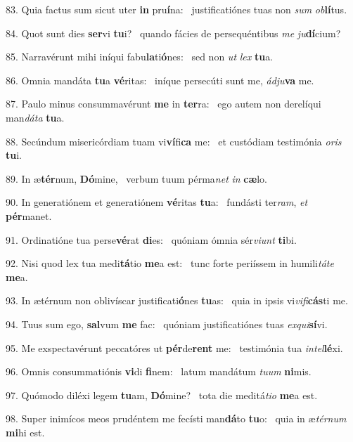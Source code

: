 83. Quia factus sum sicut uter \textbf{in} pru\textbf{í}na: \ast\  justificatiónes tuas non \textit{sum} \textit{ob}\textbf{lí}tus.\

84. Quot sunt dies \textbf{ser}vi \textbf{tu}i? \ast\  quando fácies de persequéntibus \textit{me} \textit{ju}\textbf{dí}cium?\

85. Narravérunt mihi iníqui fabu\textbf{la}ti\textbf{ó}nes: \ast\  sed non \textit{ut} \textit{lex} \textbf{tu}a.\

86. Omnia mandáta \textbf{tu}a \textbf{vé}ritas: \ast\  iníque persecúti sunt me, \textit{ád}\textit{ju}\textbf{va} me.\

87. Paulo minus consummavérunt \textbf{me} in \textbf{ter}ra: \ast\  ego autem non derelíqui man\textit{dá}\textit{ta} \textbf{tu}a.\

88. Secúndum misericórdiam tuam vi\textbf{ví}fi\textbf{ca} me: \ast\  et custódiam testimónia \textit{o}\textit{ris} \textbf{tu}i.\

89. In æ\textbf{tér}num, \textbf{Dó}mine, \ast\  verbum tuum pérma\textit{net} \textit{in} \textbf{cæ}lo.\

90. In generatiónem et generatiónem \textbf{vé}ritas \textbf{tu}a: \ast\  fundásti ter\textit{ram}, \textit{et} \textbf{pér}manet.\

91. Ordinatióne tua perse\textbf{vé}rat \textbf{di}es: \ast\  quóniam ómnia sér\textit{vi}\textit{unt} \textbf{ti}bi.\

92. Nisi quod lex tua medi\textbf{tá}tio \textbf{me}a est: \ast\  tunc forte periíssem in humili\textit{tá}\textit{te} \textbf{me}a.\

93. In ætérnum non oblivíscar justificati\textbf{ó}nes \textbf{tu}as: \ast\  quia in ipsis vi\textit{vi}\textit{fi}\textbf{cás}ti me.\

94. Tuus sum ego, \textbf{sal}vum \textbf{me} fac: \ast\  quóniam justificatiónes tuas \textit{ex}\textit{qui}\textbf{sí}vi.\

95. Me exspectavérunt peccatóres ut \textbf{pér}de\textbf{rent} me: \ast\  testimónia tua \textit{in}\textit{tel}\textbf{lé}xi.\

96. Omnis consummatiónis \textbf{vi}di \textbf{fi}nem: \ast\  latum mandátum \textit{tu}\textit{um} \textbf{ni}mis.\

97. Quómodo diléxi legem \textbf{tu}am, \textbf{Dó}mine? \ast\  tota die meditá\textit{ti}\textit{o} \textbf{me}a est.\

98. Super inimícos meos prudéntem me fecísti man\textbf{dá}to \textbf{tu}o: \ast\  quia in æ\textit{tér}\textit{num} \textbf{mi}hi est.\

